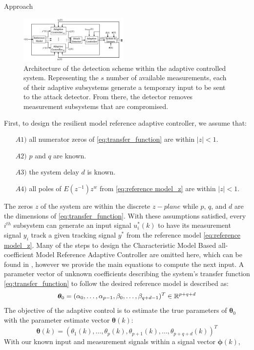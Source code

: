 \begin{section}{Approach}
\begin{figure}[ht!]
\vspace{1pt}
\centering
\includegraphics[width=0.48\textwidth]{Figures/con_and_det.png}
\caption{Architecture of the detection scheme within the adaptive controlled system. Representing  the $s$ number of available measurements, each of their adaptive subsystems generate a temporary input to be sent to the attack detector. From there, the detector removes measurement subsystems that are compromised.}
\label{fig:det_arch}
\end{figure}

First, to design the resilient model reference adaptive controller, we assume that:
	\begin{enumerate}[leftmargin=3\parindent]
	\item[$A1)$] all numerator zeros of \eqref{eq:transfer_function} are within $|z|<1$.
	\item[$A2)$] $p$ and $q$ are known. 
	\item[$A3)$] the system delay $d$ is known.
	\item[$A4)$] all poles of $E(z^{-1})z^w$ from \eqref{eq:reference model_z} are within $|z|<1$.
	\end{enumerate}
The zeros $z$ of the system are within the discrete $z-plane$ while $p$, $q$, and $d$ are the dimensions of \eqref{eq:transfer_function}. With these assumptions satisfied, every $i^{th}$ subsystem can generate an input signal $u^*_i(k)$ to have its measurement signal $y_i$ track a given tracking signal $y^*$ from the reference model \eqref{eq:reference model_z}. Many of the steps to design the Characteristic Model Based all-coefficient Model Reference Adaptive Controller are omitted here, which can be found in \cite{tao2003adaptive,Goodwin1643720}, however we provide the main equations to compute the next input. A parameter vector of unknown coefficients describing the system's transfer function \eqref{eq:transfer_function} to follow the desired reference model is described as:
    \begin{equation}
	\bm{\theta}_0=(\alpha_0, \dots ,\alpha_{p-1},\beta_0, \dots ,\beta_{q+d-1})^T \in \mathbb{R}^{p+q+d}
	\end{equation}
The objective of the adaptive control is to estimate the true parameters of $\bm{\theta}_0$ with the parameter estimate vector $\bm{\theta}(k)$:
    \begin{equation}
    \bm{\theta}(k)=(\theta_1(k), \dots ,\theta_p(k),\theta_{p+1}(k), \dots ,\theta_{p+q+d}(k))^T
	\end{equation}
With our known input and measurement signals within a signal vector $\bm{\phi}(k)$,
    

\end{section}
